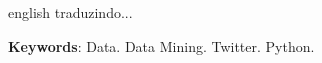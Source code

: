 \begin{resumo}[ABSTRACT]
 \begin{otherlanguage*}{english}
traduzindo...
   
   \vspace{\onelineskip}
 
   \noindent 
   \textbf{Keywords}: Data. Data Mining. Twitter. Python.
 \end{otherlanguage*}
\end{resumo}
